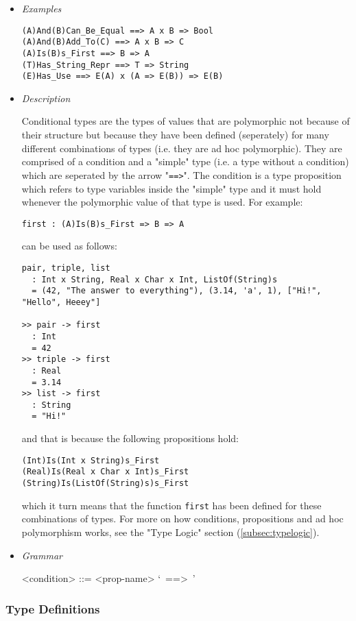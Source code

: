 \documentclass{article}
\begin{document}
\begin{itemize}
\item \textit{Examples}
\begin{verbatim}
(A)And(B)Can_Be_Equal ==> A x B => Bool
(A)And(B)Add_To(C) ==> A x B => C
(A)Is(B)s_First ==> B => A
(T)Has_String_Repr ==> T => String
(E)Has_Use ==> E(A) x (A => E(B)) => E(B)
\end{verbatim}

\item \textit{Description}

Conditional types are the types of values that are polymorphic not because of
their structure but because they have been defined (seperately) for many
different combinations of types (i.e. they are ad hoc polymorphic). They are
comprised of a condition and a "simple" type (i.e. a type without a
condition) which are seperated by the arrow "\texttt{==>}". The condition is a
type proposition which refers to type variables inside the "simple" type
and it must hold whenever the polymorphic value of that type is used. For
example:
\begin{verbatim}
first : (A)Is(B)s_First => B => A
\end{verbatim}
can be used as follows:
\begin{verbatim}
pair, triple, list
  : Int x String, Real x Char x Int, ListOf(String)s
  = (42, "The answer to everything"), (3.14, 'a', 1), ["Hi!", "Hello", Heeey"]

>> pair -> first
  : Int
  = 42
>> triple -> first
  : Real
  = 3.14
>> list -> first
  : String
  = "Hi!"
\end{verbatim}
and that is because the following propositions hold:
\begin{verbatim}
(Int)Is(Int x String)s_First
(Real)Is(Real x Char x Int)s_First
(String)Is(ListOf(String)s)s_First
\end{verbatim}
which it turn means that the function \texttt{first} has been defined
for these combinations of types. For more on how conditions, propositions and
ad hoc polymorphism works, see the "Type Logic" section (\ref{subsec:typelogic}).

\item \textit{Grammar}
\begin{grammar}
<condition> ::= <prop-name> `\ ==>\ ' 
\end{grammar}

\end{itemize}

\subsubsection{Type Definitions}
\label{subsubsec:tdefs}
\end{document}
